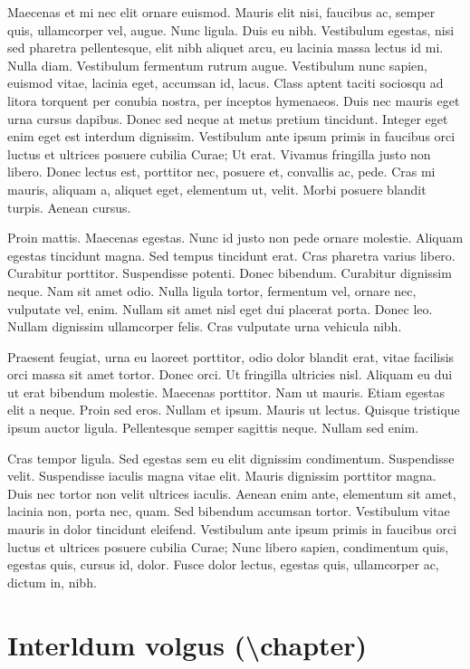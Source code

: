 \documentclass[nochapterpage,bigchapter,linedtoc,longdoc,colorback,accentcolor=tud4c]{tudreport}
\begin{document}
    Maecenas et mi nec elit ornare euismod. Mauris elit nisi, faucibus ac, semper quis, ullamcorper vel, augue. Nunc ligula. Duis eu nibh. Vestibulum egestas, nisi sed pharetra pellentesque, elit nibh aliquet arcu, eu lacinia massa lectus id mi. Nulla diam. Vestibulum fermentum rutrum augue. Vestibulum nunc sapien, euismod vitae, lacinia eget, accumsan id, lacus. Class aptent taciti sociosqu ad litora torquent per conubia nostra, per inceptos hymenaeos. Duis nec mauris eget urna cursus dapibus. Donec sed neque at metus pretium tincidunt. Integer eget enim eget est interdum dignissim. Vestibulum ante ipsum primis in faucibus orci luctus et ultrices posuere cubilia Curae; Ut erat. Vivamus fringilla justo non libero. Donec lectus est, porttitor nec, posuere et, convallis ac, pede. Cras mi mauris, aliquam a, aliquet eget, elementum ut, velit. Morbi posuere blandit turpis. Aenean cursus.

    Proin mattis. Maecenas egestas. Nunc id justo non pede ornare molestie. Aliquam egestas tincidunt magna. Sed tempus tincidunt erat. Cras pharetra varius libero. Curabitur porttitor. Suspendisse potenti. Donec bibendum. Curabitur dignissim neque. Nam sit amet odio. Nulla ligula tortor, fermentum vel, ornare nec, vulputate vel, enim. Nullam sit amet nisl eget dui placerat porta. Donec leo. Nullam dignissim ullamcorper felis. Cras vulputate urna vehicula nibh.

    Praesent feugiat, urna eu laoreet porttitor, odio dolor blandit erat, vitae facilisis orci massa sit amet tortor. Donec orci. Ut fringilla ultricies nisl. Aliquam eu dui ut erat bibendum molestie. Maecenas porttitor. Nam ut mauris. Etiam egestas elit a neque. Proin sed eros. Nullam et ipsum. Mauris ut lectus. Quisque tristique ipsum auctor ligula. Pellentesque semper sagittis neque. Nullam sed enim.

    Cras tempor ligula. Sed egestas sem eu elit dignissim condimentum. Suspendisse velit. Suspendisse iaculis magna vitae elit. Mauris dignissim porttitor magna. Duis nec tortor non velit ultrices iaculis. Aenean enim ante, elementum sit amet, lacinia non, porta nec, quam. Sed bibendum accumsan tortor. Vestibulum vitae mauris in dolor tincidunt eleifend. Vestibulum ante ipsum primis in faucibus orci luctus et ultrices posuere cubilia Curae; Nunc libero sapien, condimentum quis, egestas quis, cursus id, dolor. Fusce dolor lectus, egestas quis, ullamcorper ac, dictum in, nibh.

  \chapter{Interldum volgus (\textbackslash chapter)}
\end{document}
